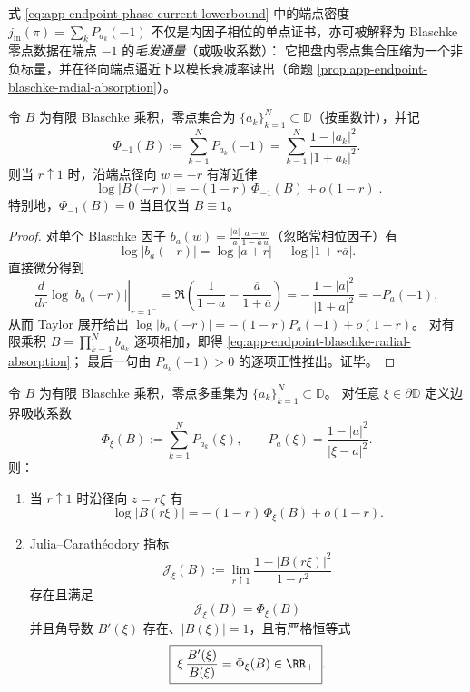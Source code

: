 \begin{remark}[端点毛发通量与径向吸收系数]\label{rem:app-endpoint-hair-flux-absorption}
式 \eqref{eq:app-endpoint-phase-current-lowerbound} 中的端点密度
\(
j_{\mathrm{in}}(\pi)=\sum_k P_{a_k}(-1)
\)
不仅是内因子相位的单点证书，亦可被解释为 Blaschke 零点数据在端点 \(-1\) 的\emph{毛发通量}（或吸收系数）：
它把盘内零点集合压缩为一个非负标量，并在径向端点逼近下以模长衰减率读出（命题 \ref{prop:app-endpoint-blaschke-radial-absorption}）。
\end{remark}

\begin{proposition}\label{prop:app-endpoint-blaschke-radial-absorption}
令 \(B\) 为有限 Blaschke 乘积，零点集合为 \(\{a_k\}_{k=1}^{N}\subset\mathbb{D}\)（按重数计），并记
\[
\Phi_{-1}(B):=\sum_{k=1}^{N}P_{a_k}(-1)=\sum_{k=1}^{N}\frac{1-|a_k|^2}{|1+a_k|^2}.
\]
则当 \(r\uparrow 1\) 时，沿端点径向 \(w=-r\) 有渐近律
\begin{equation}\label{eq:app-endpoint-blaschke-radial-absorption}
\boxed{\;
\log|B(-r)|=-(1-r)\,\Phi_{-1}(B)+o(1-r)\; }.
\end{equation}
特别地，\(\Phi_{-1}(B)=0\) 当且仅当 \(B\equiv 1\)。
\end{proposition}

\begin{proof}
对单个 Blaschke 因子 \(b_a(w)=\frac{|a|}{a}\frac{a-w}{1-\overline a\,w}\)（忽略常相位因子）有
\[
\log|b_a(-r)|
=\log|a+r|-\log|1+r\overline a|.
\]
直接微分得到
\[
\left.\frac{d}{dr}\log|b_a(-r)|\right|_{r=1^-}
=\Re\!\left(\frac{1}{1+a}-\frac{\overline a}{1+\overline a}\right)
=-\,\frac{1-|a|^2}{|1+a|^2}
=-P_a(-1),
\]
从而 Taylor 展开给出
\(
\log|b_a(-r)|=-(1-r)P_a(-1)+o(1-r)
\)。
对有限乘积 \(B=\prod_{k=1}^{N}b_{a_k}\) 逐项相加，即得 \eqref{eq:app-endpoint-blaschke-radial-absorption}；
最后一句由 \(P_{a_k}(-1)>0\) 的逐项正性推出。证毕。
\end{proof}

\begin{theorem}\label{thm:app-boundary-absorption-julia-caratheodory}
令 \(B\) 为有限 Blaschke 乘积，零点多重集为 \(\{a_k\}_{k=1}^{N}\subset\mathbb{D}\)。
对任意 \(\xi\in\partial\mathbb{D}\) 定义边界吸收系数
\[
\Phi_{\xi}(B):=\sum_{k=1}^{N}P_{a_k}(\xi),
\qquad
P_a(\xi)=\frac{1-|a|^2}{|\xi-a|^2}.
\]
则：
\begin{enumerate}
  \item 当 \(r\uparrow 1\) 时沿径向 \(z=r\xi\) 有
  \[
  \log|B(r\xi)|=-(1-r)\,\Phi_{\xi}(B)+o(1-r).
  \]
  \item Julia--Carath\'eodory 指标
  \[
  \mathcal{J}_{\xi}(B):=\lim_{r\uparrow 1}\frac{1-|B(r\xi)|^2}{1-r^2}
  \]
  存在且满足
  \[
  \boxed{\;\mathcal{J}_{\xi}(B)=\Phi_{\xi}(B)\;}
  \]
  并且角导数 \(B'(\xi)\) 存在、\(|B(\xi)|=1\)，且有严格恒等式
  \[
  \boxed{\;\xi\,\frac{B'(\xi)}{B(\xi)}=\Phi_{\xi}(B)\in\RR_{+}\; }.
  \]
\end{enumerate}
\end{theorem}

